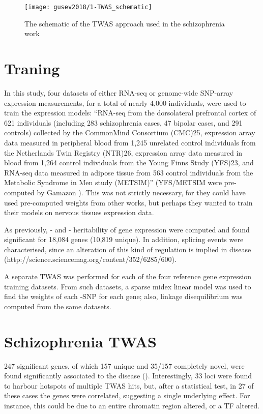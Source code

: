 \documentclass[../main.tex]{subfiles}
\begin{document}
\begin{figure}
	\texttt{[image: gusev2018/1-TWAS\_schematic]}
	\caption{The schematic of the TWAS approach used in the 
schizophrenia work}
\end{figure}

\section{Traning}

In this study, four datasets of either RNA-seq or genome-wide SNP-array 
expression measurements, for a total of nearly 4,000 individuals,  were 
used to train the expression models: \enquote{RNA-seq from the 
dorsolateral prefrontal cortex of 621 individuals (including 283 
schizophrenia cases, 47 bipolar cases, and 291 controls) collected by 
the CommonMind Consortium (CMC)25, expression array data measured in 
peripheral blood from 1,245 unrelated control individuals from the 
Netherlands Twin Registry (NTR)26, expression array data measured in 
blood from 1,264 control individuals from the Young Finns Study (YFS)23, 
and RNA-seq data measured in adipose tissue from 563 control individuals 
from the Metabolic Syndrome in Men study (METSIM)} (YFS/METSIM were 
pre-computed by Gamazon ). This was not strictly necessary, 
for they could have used pre-computed weights from other works, but 
perhaps they wanted to train their models on nervous tissues expression 
data.

As previously, \cis- and \trans- heritability of gene expression were 
computed and found significant for 18,084 genes (10,819 unique). In 
addition, splicing events were characterised, since an alteration of 
this kind of regulation is implied in disease 
(http://science.sciencemag.org/content/352/6285/600).

A separate TWAS was performed for each of the four reference gene 
expression training datasets. From such datasets, a sparse midex linear 
model was used to find the weights of each \cis-SNP for each gene; also, 
linkage disequilibrium was computed from the same datasets.

\section{Schizophrenia TWAS}

247 significant genes, of which 157 unique and 35/157 completely novel, 
	were found significantly associated to the disease 
(). Interestingly, 33 loci were found to harbour 
hotspots of multiple TWAS hits, but, after a statistical test, in 27 of 
these cases the genes were correlated, suggesting a single underlying 
effect. For instance, this could be due to an entire chromatin region 
altered, or a TF altered.
\end{document}
